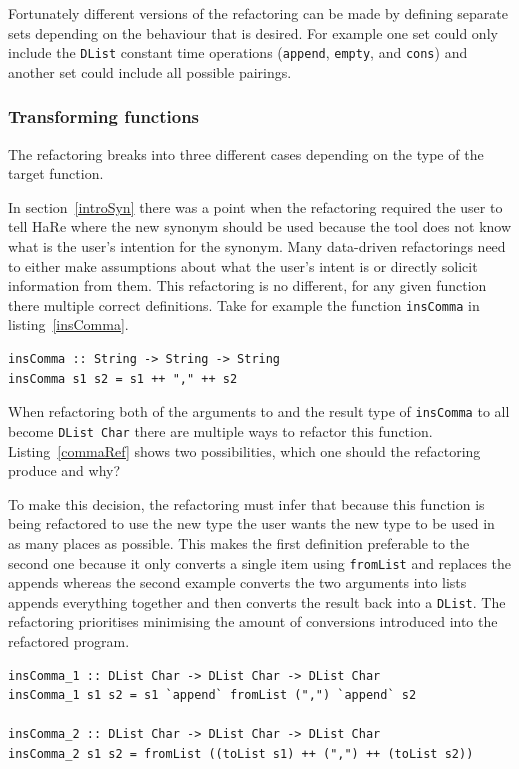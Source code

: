 Fortunately different versions of the refactoring can be made by defining separate sets depending on the behaviour that is desired. For example one set could only include the \texttt{DList} constant time operations (\texttt{append}, \texttt{empty}, and \texttt{cons}) and another set could include all possible pairings. 

\subsubsection{Transforming functions}

The refactoring breaks into three different cases depending on the type of the target function. 

In section~\ref{introSyn} there was a point when the refactoring required the user to tell HaRe where the new synonym should be used because the tool does not know what is the user's intention for the synonym. Many data-driven refactorings need to either make assumptions about what the user's intent is or directly solicit information from them. This refactoring is no different, for any given function there multiple correct definitions. Take for example the function \texttt{insComma} in listing~\ref{insComma}.

\begin{lstlisting}[label=insComma,caption={\texttt{insComma}}]
insComma :: String -> String -> String
insComma s1 s2 = s1 ++ "," ++ s2
\end{lstlisting}  

When refactoring both of the arguments to and the result type of \texttt{insComma} to all become \texttt{DList Char} there are multiple ways to refactor this function. Listing~\ref{commaRef} shows two possibilities, which one should the refactoring produce and why?

To make this decision, the refactoring must infer that because this function is being refactored to use the new type the user wants the new type to be used in as many places as possible. This makes the first definition preferable to the second one because it only converts a single item using \texttt{fromList} and replaces the appends whereas the second example converts the two arguments into lists appends everything together and then converts the result back into a \texttt{DList}. The refactoring prioritises minimising the amount of conversions introduced into the refactored program.

\begin{lstlisting}[label=commaRef,caption={Two possible refactorings for \texttt{insComma}}]
insComma_1 :: DList Char -> DList Char -> DList Char
insComma_1 s1 s2 = s1 `append` fromList (",") `append` s2

insComma_2 :: DList Char -> DList Char -> DList Char
insComma_2 s1 s2 = fromList ((toList s1) ++ (",") ++ (toList s2))
\end{lstlisting}

